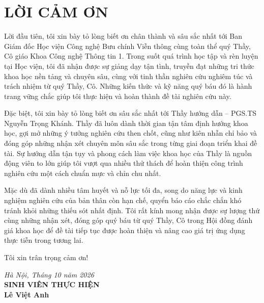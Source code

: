\documentclass[12pt,a4paper,oneside]{report}
\begin{document}



\setcounter{page}{1}
\chapter*{LỜI CẢM ƠN}

Lời đầu tiên, tôi xin bày tỏ lòng biết ơn chân thành và sâu sắc nhất tới Ban Giám đốc Học viện Công nghệ Bưu chính Viễn thông cùng toàn thể quý Thầy, Cô giáo Khoa Công nghệ Thông tin 1. Trong suốt quá trình học tập và rèn luyện tại Học viện, tôi đã nhận được sự giảng dạy tận tình, truyền đạt những tri thức khoa học nền tảng và chuyên sâu, cùng với tinh thần nghiên cứu nghiêm túc và trách nhiệm từ quý Thầy, Cô. Những kiến thức và kỹ năng quý báu đó là hành trang vững chắc giúp tôi thực hiện và hoàn thành đề tài nghiên cứu này.

Đặc biệt, tôi xin bày tỏ lòng biết ơn sâu sắc nhất tới Thầy hướng dẫn -- PGS.TS Nguyễn Trọng Khánh. Thầy đã luôn dành thời gian tận tâm định hướng khoa học, gợi mở những ý tưởng nghiên cứu then chốt, cũng như kiên nhẫn chỉ bảo và đóng góp những nhận xét chuyên môn sâu sắc trong từng giai đoạn triển khai đề tài. Sự hướng dẫn tận tụy và phong cách làm việc khoa học của Thầy là nguồn động viên to lớn giúp tôi vượt qua nhiều thử thách để hoàn thiện công trình nghiên cứu một cách chuẩn mực và chỉn chu nhất.

Mặc dù đã dành nhiều tâm huyết và nỗ lực tối đa, song do năng lực và kinh nghiệm nghiên cứu của bản thân còn hạn chế, quyển báo cáo chắc chắn khó tránh khỏi những thiếu sót nhất định. Tôi rất kính mong nhận được sự lượng thứ cùng những nhận xét, đóng góp quý báu từ quý Thầy, Cô trong Hội đồng đánh giá khoa học để đề tài tiếp tục được hoàn thiện và nâng cao giá trị ứng dụng thực tiễn trong tương lai.

Tôi xin trân trọng cảm ơn!

\vspace{1.5cm}
\begin{flushright}
    \textit{Hà Nội, Tháng 10 năm 2026} \\
    \textbf{SINH VIÊN THỰC HIỆN} \\
    \vspace{1.5cm}
    \textbf{Lê Việt Anh}
\end{flushright}
\end{document}
